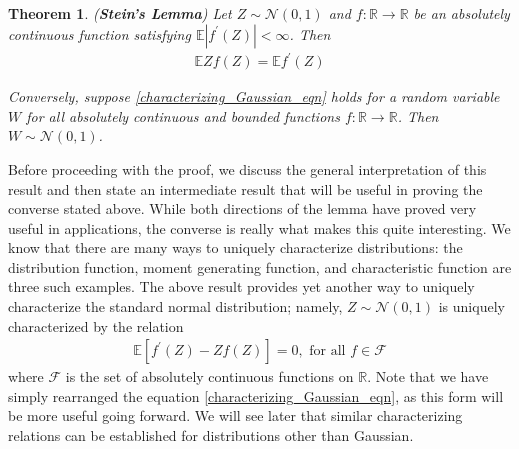 \documentclass[12pt]{article}
\newcommand*{\abs}[1]{\left\lvert#1\right\rvert}
\newcommand{\R}{\mathbb{R}}
\newcommand{\E}{\mathbb{E}}
\newcommand{\Gaussian}{\mathcal{N}}
\newcommand{\functionSpace}{\mathcal{F}}
\newtheorem{thm}{Theorem}
\begin{document}
\begin{thm} \label{Steins_lemma}
(\textbf{Stein's Lemma}) Let $Z \sim \Gaussian(0, 1)$ and $f: \R \to \R$ be an absolutely continuous function satisfying $\E\abs{f^\prime(Z)} < \infty$. Then 
\begin{align}
\E Z f(Z) = \E f^\prime(Z) \label{characterizing_Gaussian_eqn}
\end{align}

Conversely, suppose \ref{characterizing_Gaussian_eqn} holds for a random variable $W$ for all absolutely continuous and bounded functions $f: \R \to \R$. 
Then $W \sim \Gaussian(0, 1)$. 
\end{thm}

Before proceeding with the proof, we discuss the general interpretation of this result and then state an intermediate result that will be useful in proving the converse stated above. 
While both directions of the lemma have proved very useful in applications, the converse is really what makes this quite interesting. We know that there are many ways to uniquely 
characterize distributions: the distribution function, moment generating function, and characteristic function are three such examples. The above result provides yet another way to 
uniquely characterize the standard normal distribution; namely, $Z \sim \Gaussian(0, 1)$ is uniquely characterized by the relation 
\begin{align}
\E\left[f^\prime(Z) - Z f(Z)\right] = 0, \text{ for all } f \in \functionSpace \label{characterizing_Gaussian_eqn_2}
\end{align}
where $\functionSpace$ is the set of absolutely continuous functions on $\R$. Note that we have simply rearranged the equation \ref{characterizing_Gaussian_eqn}, as this 
form will be more useful going forward. 
We will see later that similar characterizing relations can be established for distributions other than 
Gaussian. 
\end{document}
